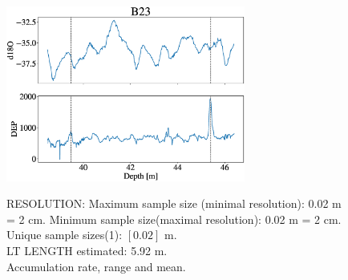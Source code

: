\documentclass[11pt]{article}
\begin{document}
\begin{figure}[h]
	\centering
	\includegraphics[width=0.7\textwidth]{Core_LT_B23.eps}
	\label{fig:B23}
	\caption{RESOLUTION: Maximum sample size (minimal resolution): 0.02 m = 2 cm. Minimum sample size(maximal resolution): 0.02 m = 2 cm. Unique sample sizes(1): $[0.02]$ m.\\
		LT LENGTH estimated: 5.92 m.\\
		Accumulation rate, range and mean.}
\end{figure}
\newpage
\end{document}
